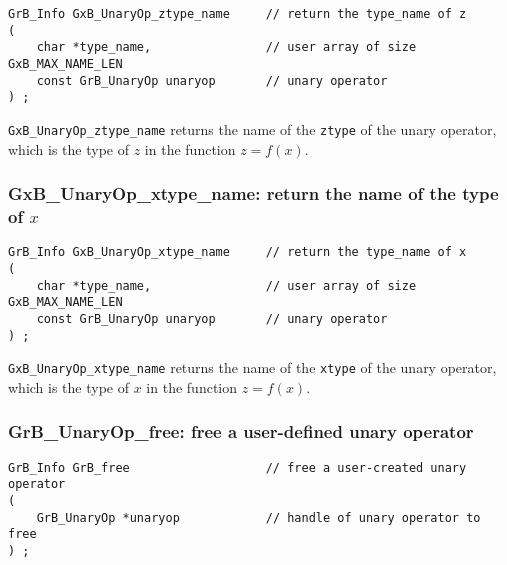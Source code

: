 \documentclass[12pt]{article}
\begin{document}
\begin{mdframed}[userdefinedwidth=6in]
{\footnotesize
\begin{verbatim}
GrB_Info GxB_UnaryOp_ztype_name     // return the type_name of z
(
    char *type_name,                // user array of size GxB_MAX_NAME_LEN
    const GrB_UnaryOp unaryop       // unary operator
) ;
\end{verbatim}
}\end{mdframed}

\verb'GxB_UnaryOp_ztype_name' returns the name of the \verb'ztype' of the unary
operator, which is the type of $z$ in the function $z=f(x)$.

\subsubsection{{\sf GxB\_UnaryOp\_xtype\_name:} return the name of the type of $x$}
\label{unaryop_xtype_name}

\begin{mdframed}[userdefinedwidth=6in]
{\footnotesize
\begin{verbatim}
GrB_Info GxB_UnaryOp_xtype_name     // return the type_name of x
(
    char *type_name,                // user array of size GxB_MAX_NAME_LEN
    const GrB_UnaryOp unaryop       // unary operator
) ;
\end{verbatim}
}\end{mdframed}

\verb'GxB_UnaryOp_xtype_name' returns the name of the \verb'xtype' of the unary
operator, which is the type of $x$ in the function $z=f(x)$.

\subsubsection{{\sf GrB\_UnaryOp\_free:} free a user-defined unary operator}
\label{unaryop_free}

\begin{mdframed}[userdefinedwidth=6in]
{\footnotesize
\begin{verbatim}
GrB_Info GrB_free                   // free a user-created unary operator
(
    GrB_UnaryOp *unaryop            // handle of unary operator to free
) ;
\end{verbatim}
}\end{mdframed}
\end{document}
